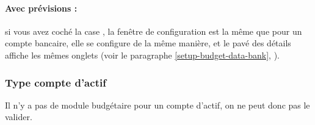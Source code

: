 \paragraph{Avec prévisions :} si vous avez coché la case , la fenêtre de configuration est la même que pour un compte bancaire, elle se configure de la même manière, et le pavé des détails affiche les mêmes onglets (voir le paragraphe \vref{setup-budget-data-bank}, ).


\subsubsection{Type compte d'actif\label{setup-budget-data-asset}}

Il n'y a pas de module budgétaire pour un compte d'actif, on ne peut donc pas le valider.




